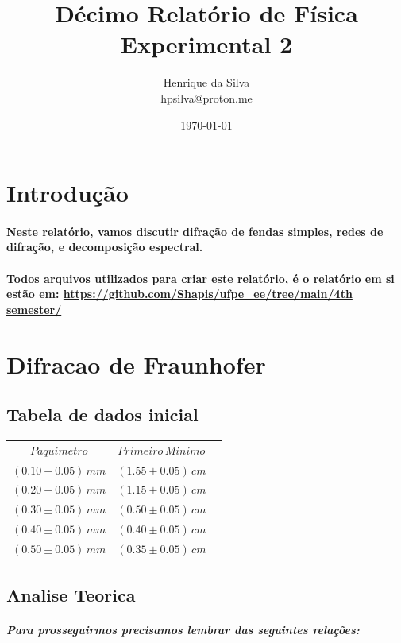 \documentclass[12pt,twoside, a4paper, twocolumn]{article}
\title{Décimo  Relatório de Física Experimental 2}
\author{Henrique da Silva \\ hpsilva@proton.me}
\date{\today}
\begin{document}
\maketitle
{}
\newpage
\tableofcontents
\newpage

\section{Introdução}

\paragraph*{Neste relatório, vamos discutir difração de fendas simples, redes de difração, e decomposição espectral.}

\paragraph*{Todos arquivos utilizados para criar este relatório, é o relatório em si estão em:  \url{https://github.com/Shapis/ufpe_ee/tree/main/4th semester/}}


\section{Difracao de Fraunhofer}


\subsection{Tabela de dados inicial}

\begin{center}
  \begin{tabular}{ |c|c|c| }
    \hline
    $Paquimetro$          & $Primeiro\,Minimo$    \\
    $(0.10 \pm 0.05)\,mm$ & $(1.55 \pm 0.05)\,cm$ \\
    $(0.20 \pm 0.05)\,mm$ & $(1.15 \pm 0.05)\,cm$ \\
    $(0.30 \pm 0.05)\,mm$ & $(0.50 \pm 0.05)\,cm$ \\
    $(0.40 \pm 0.05)\,mm$ & $(0.40 \pm 0.05)\,cm$ \\
    $(0.50 \pm 0.05)\,mm$ & $(0.35 \pm 0.05)\,cm$ \\
    \hline
  \end{tabular}
\end{center}

\pagebreak
\subsection{Analise Teorica}
\subparagraph*{Para prosseguirmos precisamos lembrar das seguintes relações:}
\end{document}
